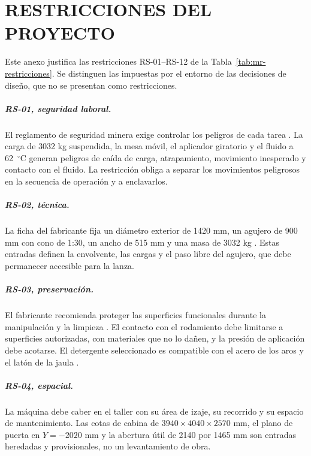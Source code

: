 \chapter{RESTRICCIONES DEL PROYECTO}
\label{anx:restricciones}

Este anexo justifica las restricciones RS-01--RS-12 de la Tabla~\ref{tab:mr-restricciones}. Se distinguen las impuestas por el entorno de las decisiones de diseño, que no se presentan como restricciones.

\paragraph{RS-01, seguridad laboral.} El reglamento de seguridad minera exige controlar los peligros de cada tarea \cite{ds024}. La carga de 3032 kg suspendida, la mesa móvil, el aplicador giratorio y el fluido a 62~$^\circ$C generan peligros de caída de carga, atrapamiento, movimiento inesperado y contacto con el fluido. La restricción obliga a separar los movimientos peligrosos en la secuencia de operación y a enclavarlos.

\paragraph{RS-02, técnica.} La ficha del fabricante fija un diámetro exterior de 1420 mm, un agujero de 900 mm con cono de 1:30, un ancho de 515 mm y una masa de 3032 kg \cite{skf241}. Estas entradas definen la envolvente, las cargas y el paso libre del agujero, que debe permanecer accesible para la lanza.

\paragraph{RS-03, preservación.} El fabricante recomienda proteger las superficies funcionales durante la manipulación y la limpieza \cite{skfmaintenance2011}. El contacto con el rodamiento debe limitarse a superficies autorizadas, con materiales que no lo dañen, y la presión de aplicación debe acotarse. El detergente seleccionado es compatible con el acero de los aros y el latón de la jaula \cite{zep36342}.

\paragraph{RS-04, espacial.} La máquina debe caber en el taller con su área de izaje, su recorrido y su espacio de mantenimiento. Las cotas de cabina de $3940\times4040\times2570$ mm, el plano de puerta en $Y=-2020$ mm y la abertura útil de 2140 por 1465 mm son entradas heredadas y provisionales, no un levantamiento de obra.

